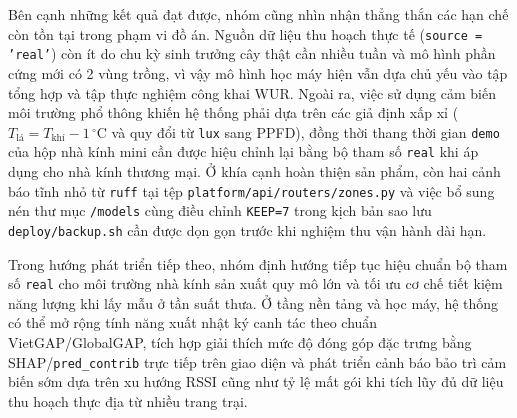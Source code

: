 Bên cạnh những kết quả đạt được, nhóm cũng nhìn nhận thẳng thắn các hạn chế còn tồn tại trong phạm vi đồ án. Nguồn dữ liệu thu hoạch thực tế (\texttt{source = 'real'}) còn ít do chu kỳ sinh trưởng cây thật cần nhiều tuần và mô hình phần cứng mới có 2 vùng trồng, vì vậy mô hình học máy hiện vẫn dựa chủ yếu vào tập tổng hợp và tập thực nghiệm công khai WUR. Ngoài ra, việc sử dụng cảm biến môi trường phổ thông khiến hệ thống phải dựa trên các giả định xấp xỉ (\(T_{\text{lá}} = T_{\text{khí}} - 1\,^\circ\text{C}\) và quy đổi từ \texttt{lux} sang PPFD), đồng thời thang thời gian \texttt{demo} của hộp nhà kính mini cần được hiệu chỉnh lại bằng bộ tham số \texttt{real} khi áp dụng cho nhà kính thương mại. Ở khía cạnh hoàn thiện sản phẩm, còn hai cảnh báo tĩnh nhỏ từ \texttt{ruff} tại tệp \texttt{platform/api/routers/zones.py} và việc bổ sung nén thư mục \texttt{/models} cùng điều chỉnh \texttt{KEEP=7} trong kịch bản sao lưu \texttt{deploy/backup.sh} cần được dọn gọn trước khi nghiệm thu vận hành dài hạn.

Trong hướng phát triển tiếp theo, nhóm định hướng tiếp tục hiệu chuẩn bộ tham số \texttt{real} cho môi trường nhà kính sản xuất quy mô lớn và tối ưu cơ chế tiết kiệm năng lượng khi lấy mẫu ở tần suất thưa. Ở tầng nền tảng và học máy, hệ thống có thể mở rộng tính năng xuất nhật ký canh tác theo chuẩn VietGAP/GlobalGAP, tích hợp giải thích mức độ đóng góp đặc trưng bằng SHAP/\texttt{pred\_contrib} trực tiếp trên giao diện và phát triển cảnh báo bảo trì cảm biến sớm dựa trên xu hướng RSSI cũng như tỷ lệ mất gói khi tích lũy đủ dữ liệu thu hoạch thực địa từ nhiều trang trại.
